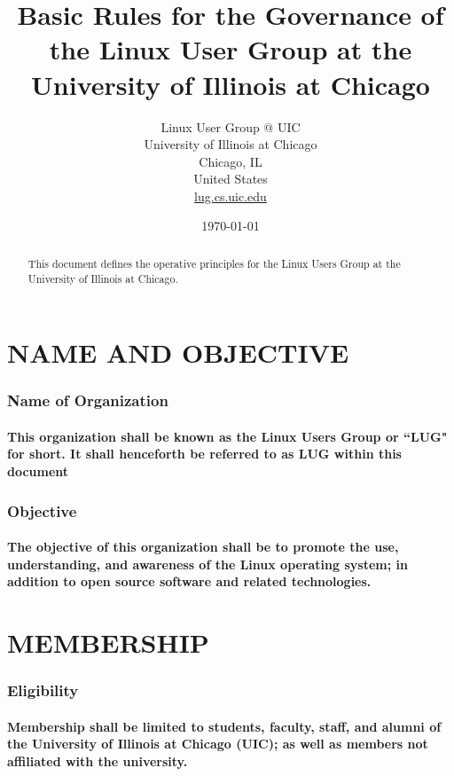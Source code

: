 \documentclass[letter]{report}
\begin{document}
\title{Basic Rules for the Governance of the Linux User Group at the University of Illinois at Chicago}
\author{Linux User Group @ UIC\\
	University of Illinois at Chicago\\
		Chicago, IL\\
		United States\\
		\url{lug.cs.uic.edu}}
\date{\today}
\maketitle


\begin{abstract}
\noindent This document defines the operative principles for the Linux Users Group at the University of Illinois at Chicago.
\end{abstract}

\part{NAME AND OBJECTIVE}
\section{Name of Organization}
\subsection{This organization shall be known as the Linux Users Group or ``LUG" for short.  It shall henceforth be referred to as LUG within this document}  

\section{Objective}
\subsection{The objective of this organization shall be to promote the use, understanding, and awareness of the Linux operating system; in addition to open source software and related technologies.}

\part{MEMBERSHIP}
\section{Eligibility}
\subsection{Membership shall be limited to students, faculty, staff, and alumni of the University of Illinois at Chicago (UIC); as well as members not affiliated with the university.}
\end{document}
